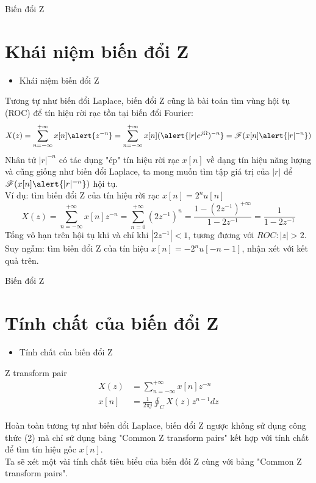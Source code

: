 \documentclass[8pt]{beamer}
\begin{document}
\begin{frame}{Biến đổi Z}
\section{Khái niệm biến đổi Z}
\begin{itemize}
	\item Khái niệm biến đổi Z
\end{itemize}
Tương tự như biến đổi Laplace, biến đổi Z cũng là bài toán tìm vùng hội tụ (ROC) để tín hiệu rời rạc tồn tại biến đổi Fourier:
\begin{equation*}
\begin{split}
	X(z)=\sum_{n=-\infty}^{+\infty}x[n]\alert{{z}^{-n}}=\sum_{n=-\infty}^{+\infty}x[n](\alert{|r|e^{j\Omega})^{-n}}=\mathscr{F}(x[n]\alert{|r|^{-n}})
\end{split}
\end{equation*}
Nhân tử $|r|^{-n}$ có tác dụng "ép" tín hiệu rời rạc $x[n]$ về dạng tín hiệu năng lượng và cũng giống như biến đổi Laplace, ta mong muốn tìm tập giá trị của $|r|$ để $\mathscr{F}(x[n]\alert{|r|^{-n}})$ hội tụ.
\\Ví dụ: tìm biến đổi Z của tín hiệu rời rạc $x[n]=2^{n}u[n]$
$$X(z)=\sum_{n=-\infty}^{+\infty}x[n]z^{-n}=\sum_{n=0}^{+\infty}(2z^{-1})^n=\frac{1-(2z^{-1})^{+\infty}}{1-2z^{-1}}=\frac{1}{1-2z^{-1}}$$
Tổng vô hạn trên hội tụ khi và chỉ khi $|2z^{-1}|<1$, tương đương với $ROC:|z|>2$.
\\Suy ngẫm: tìm biến đổi Z của tín hiệu $x[n]=-2^{n}u[-n-1]$, nhận xét với kết quả trên.
\end{frame}
\begin{frame}{Biến đổi Z}
\section{Tính chất của biến đổi Z}
\begin{itemize}
	\item Tính chất của biến đổi Z
\end{itemize}
\begin{block}{Z transform pair}
\begin{equation*}
\begin{split}
	X(z)&=\sum_{n=-\infty}^{+\infty}x[n]z^{-n}\\
	x[n]&=\frac{1}{2\pi j}\oint_{C} X(z)z^{n-1}dz
\end{split}
\end{equation*}
\end{block}
Hoàn toàn tương tự như biến đổi Laplace, biến đổi Z ngược không sử dụng công thức (2) mà chỉ sử dụng bảng "Common Z transform pairs" kết hợp với tính chất để tìm tín hiệu gốc $x[n]$.\\ Ta sẽ xét một vài tính chất tiêu biểu của biến đối Z cùng với bảng "Common Z transform pairs".
\end{frame}
\end{document}
